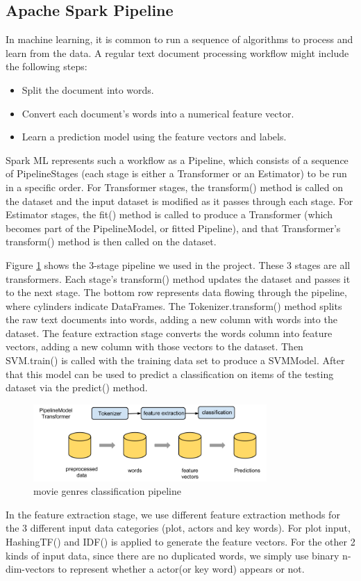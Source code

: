\documentclass{vldb}
\begin{document}
\subsection{Apache Spark Pipeline}
In machine learning, it is common to run a sequence of algorithms to process and learn from the data. A regular text document processing workflow might include the following steps:
\begin{itemize}
\item {Split the document into words.}
\item {Convert each document's words into a numerical feature vector.}
\item {Learn a prediction model using the feature vectors and labels.}
\end{itemize}
\par Spark ML represents such a workflow as a Pipeline, which consists of a sequence of PipelineStages (each stage is either a Transformer or an Estimator) to be run in a specific order. For Transformer stages, the transform() method is called on the dataset and the input dataset is modified as it passes through each stage. For Estimator stages, the fit() method is called to produce a Transformer (which becomes part of the PipelineModel, or fitted Pipeline), and that Transformer's transform() method is then called on the dataset.
\par Figure \ref{fig:pipeline} shows the 3-stage pipeline we used in the project. These 3 stages are all transformers.  Each stage's transform() method updates the dataset and passes it to the next stage. The bottom row represents data flowing through the pipeline, where cylinders indicate DataFrames. The Tokenizer.transform() method splits the raw text documents into words, adding a new column with words into the dataset. The feature extraction stage converts the words column into feature vectors, adding a new column with those vectors to the dataset. Then SVM.train() is called with the training data set to produce a SVMModel. After that this model can be used to predict a classification on items of the testing dataset via the predict() method.
\begin{figure}
\begin{center}
\includegraphics[width=3.50in]{pipeline.png}
\caption{movie genres classification pipeline}
\label{fig:pipeline}
\end{center}
\end{figure}
\par In the feature extraction stage, we use different feature extraction methods for the 3 different input data categories (plot, actors and key words). For plot input, HashingTF() and IDF() is applied to generate the feature vectors. For the other 2 kinds of input data, since there are no duplicated words, we simply use binary n-dim-vectors to represent whether a actor(or key word) appears or not.
\end{document}
